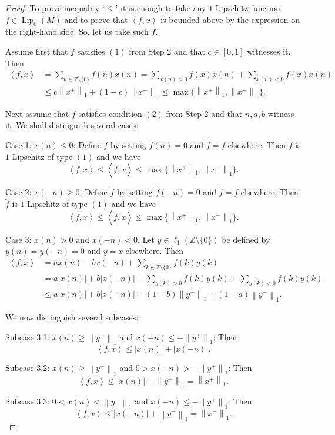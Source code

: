 \documentclass{amsart}
\numberwithin{equation}{section}
\theoremstyle{definition}
\def\zet{\mathbb Z}
\def \Lip {\operatorname{Lip}}
\def\ip#1#2{\left\langle#1,#2\right\rangle}
\newcommand{\norm}[1]{\left\|#1\right\|}
\newcommand{\abs}[1]{\left|#1\right|}
\begin{document}
\begin{proof}
To prove inequality `$\le$' it is enough to take any $1$-Lipschitz function $f\in \Lip_0(M)$ and to prove that 
$\ip{f}{x}$ is bounded above by the expression on the right-hand side. So, let us take such $f$.

Assume first that $f$ satisfies $(1)$ from Step 2 and that $c\in[0,1]$ witnesses it. Then
$$\begin{aligned}
    \ip{f}{x}&=\sum_{n\in\zet\setminus\{0\}} f(n)x(n)= \sum_{x(n)>0} f(x) x(n)+ \sum_{x(n)<0} f(x) x(n)
\\&\le c\norm{x^+}_1+(1-c)\norm{x^-}_1\le\max\{\norm{x^+}_1,\norm{x^-}_1\}.\end{aligned}$$

Next assume that $f$ satisfies condition $(2)$ from Step 2 and that $n,a,b$ witness it. We shall distinguish several cases:

Case 1: $x(n)\le 0$: Define $\widetilde{f}$ by setting $\widetilde{f}(n)=0$ and $\widetilde{f}=f$ elsewhere. Then $\widetilde{f}$ is $1$-Lipschitz of type $(1)$ and we have
$$\ip{f}{x}\le\ip{\widetilde{f}}{x}\le\max\{\norm{x^+}_1,\norm{x^-}_1\}.$$

Case 2: $x(-n)\ge 0$:  Define $\widetilde{f}$ by setting $\widetilde{f}(-n)=0$ and $\widetilde{f}=f$ elsewhere. Then $\widetilde{f}$ is $1$-Lipschitz of type $(1)$ and we have
$$\ip{f}{x}\le\ip{\widetilde{f}}{x}\le\max\{\norm{x^+}_1,\norm{x^-}_1\}.$$

Case 3: $x(n)>0$ and $x(-n)<0$. Let $y\in \ell_1(\zet\setminus\{0\})$ be defined by $y(n)=y(-n)=0$ and $y=x$ elsewhere. Then
$$\begin{aligned}
\ip{f}{x}&=a x(n)-b x(-n)+ \sum_{k\in\zet\setminus \{0\}} f(k) y(k)
\\& =a \abs{x(n)} + b \abs{x(-n)}+ \sum_{y(k)>0} f(k) y(k) + \sum_{y(k)<0} f(k) y(k)
\\&\le a \abs{x(n)} + b \abs{x(-n)}+ (1-b)\norm{y^+}_1+(1-a)\norm{y^-}_1.
\end{aligned}$$

We now distinguish several subcases:

Subcase 3.1: $x(n)\ge \norm{y^-}_1$ and $x(-n)\le -\norm{y^+}_1$: 
Then $$\ip{f}{x} \le \abs{x(n)}+\abs{x(-n)}.$$

Subcase 3.2: $x(n)\ge \norm{y^-}_1$ and $0>x(-n)> -\norm{y^+}_1$:
Then
$$\ip{f}{x} \le \abs{x(n)}+\norm{y^+}_1 =\norm{x^+}_1.$$

Subcase 3.3: $0<x(n)<\norm{y^-}_1$ and $x(-n)\le -\norm{y^+}_1$:
Then
$$\ip{f}{x} \le \abs{x(-n)}+\norm{y^-}_1 =\norm{x^-}_1.$$


\end{proof}
\end{document}
